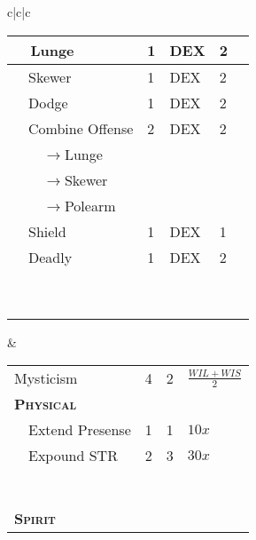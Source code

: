 \documentclass{article}
\begin{document}
\begin{tabular}{c|c|c}
\begin{tabular}{p{1.2in}|p{.15in}|p{.15in}|p{.15in}|p{.15in}}
    \hline
    ~~Lunge & 1 & \tiny{DEX} & 2 & \\
    \hline
    ~~Skewer & 1 & \tiny{DEX} & 2 & \\
    \hline
    ~~Dodge & 1 & \tiny{DEX} & 2 & \\
    \hline
    ~~Combine Offense & 2 & \tiny{DEX} & 2 & \\
    \hline
    ~~~~$\rightarrow$Lunge & & & & \\
    \hline
    ~~~~$\rightarrow$Skewer & & & & \\
    \hline
    ~~~~$\rightarrow$Polearm & & & & \\
    \hline
    ~~Shield & 1 & \tiny{DEX} & 1 & \\
    \hline
    ~~Deadly & 1 & \tiny{DEX} & 2 & \\
    \hline
    & & & & \\
    \hline
    & & & & \\
    \hline
    & & & & \\
    \hline
    & & & & \\
    \hline
    & & & & \\
    \hline
    & & & & \\
    \hline
    & & & & \\
    \hline
    & & & & \\
    \hline
    & & & & \\
  \end{tabular} &
    \begin{tabular}{p{1.4in}|p{.2in}|p{.2in}|p{.2in}}
    \textsmscbf{Name} & \texttyscbf{Rank}
    & \texttyscbf{Time} & \texttyscbf{MP} \\
    \hline
    \hline
    Mysticism & 4 & 2 & \tiny{$\frac{WIL+WIS}{2}$} \\
    \hline
    \hline
    \hline
    \textsc{\textbf{Physical}} & & & \\
    \hline
    ~~Extend Presense & 1 & 1 & $10x$ \\
    \hline
    ~~Expound STR & 2 & 3 & $30x$ \\
    \hline
    & & & \\
    \hline
    & & & \\
    \hline
    & & & \\
    \hline
    & & & \\
    \hline
    & & & \\
    \hline
    & & & \\
    \hline
    & & & \\
    \hline
    \hline
    \hline
    \textsc{\textbf{Spirit}} & & & \\

\end{tabular}
\end{tabular}
\end{document}
